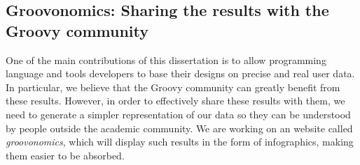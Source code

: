 \documentclass[msc]{ppgccufmg}
\begin{document}
\subsection*{Groovonomics: Sharing the results with the Groovy community}
One of the main contributions of this dissertation is to allow programming language and tools developers to base their designs on precise and real user data.
In particular, we believe that the Groovy community can greatly benefit from these results.
However, in order to effectively share these results with them, we need to generate a simpler representation of our data so they can be understood by people outside the academic community.
We are working on an website called \emph{groovonomics}, which will display such results in the form of infographics, making them easier to be absorbed.

\end{document}
